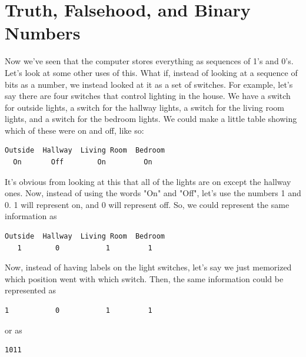 \section{Truth, Falsehood, and Binary Numbers}
\label{truthbinarynumbers}

Now we've seen that the computer stores everything as sequences of
1's and 0's.  Let's look at some other uses of this.  What if, instead
of looking at a sequence of bits as a number, we instead looked at
it as a set of switches.  For example, let's say there are four switches
that control lighting in the house.  We have a switch for outside lights,
a switch for the hallway lights, a switch for the living room lights,
and a switch for the bedroom lights.  We could make a little table
showing which of these were on and off, like so:

\begin{simpletyping}
\begin{lstlisting}
Outside  Hallway  Living Room  Bedroom
  On       Off        On         On
\end{lstlisting}
\end{simpletyping}

It's obvious from looking at this that all of the lights are on except
the hallway ones.  Now, instead of using the words "On" and "Off",
let's use the numbers 1 and 0.  1 will represent on, and 0 will represent
off.  So, we could represent the same information as

\begin{simpletyping}
\begin{lstlisting}
Outside  Hallway  Living Room  Bedroom
   1        0           1         1
\end{lstlisting}
\end{simpletyping}

Now, instead of having labels on the light switches, let's say we just
memorized which position went with which switch.  Then, the same
information could be represented as

\begin{simpletyping}
\begin{lstlisting}
1           0           1         1
\end{lstlisting}
\end{simpletyping}

or as

\begin{simpletyping}
\begin{lstlisting}
1011
\end{lstlisting}
\end{simpletyping}

